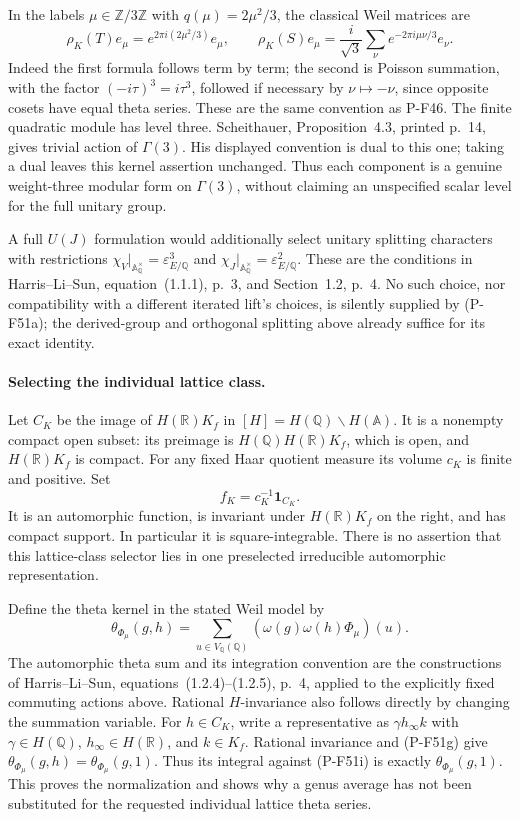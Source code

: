 \documentclass[11pt,a4paper]{article}
\begin{document}
In the labels $\mu\in\mathbb Z/3\mathbb Z$ with
$q(\mu)=2\mu^2/3$, the classical Weil matrices are
\[
 \rho_K(T)e_\mu=e^{2\pi i(2\mu^2/3)}e_\mu,
 \qquad
 \rho_K(S)e_\mu=\frac{i}{\sqrt3}
                  \sum_\nu e^{-2\pi i\mu\nu/3}e_\nu.
 \tag{P-F51h}
\]
Indeed the first formula follows term by term; the
second is Poisson summation, with the factor
$(-i\tau)^3=i\tau^3$, followed if necessary by
$\nu\mapsto-\nu$, since opposite cosets have equal
theta series. These are the same convention as P-F46.
The finite quadratic module has level three.
Scheithauer, Proposition~4.3, printed p.~14, gives
trivial action of $\Gamma(3)$. His displayed convention
is dual to this one; taking a dual leaves this kernel
assertion unchanged. Thus each component is a genuine
weight-three modular form on $\Gamma(3)$, without
claiming an unspecified scalar level for the full
unitary group.

A full $U(J)$ formulation would additionally select
unitary splitting characters with restrictions
$\chi_V|_{\mathbb A_\mathbb Q^\times}=\varepsilon_{E/\mathbb Q}^3$
and $\chi_J|_{\mathbb A_\mathbb Q^\times}=\varepsilon_{E/\mathbb Q}^2$.
These are the conditions in Harris--Li--Sun,
equation~(1.1.1), p.~3, and Section~1.2, p.~4.
No such choice, nor compatibility with a different
iterated lift's choices, is silently supplied by
(P-F51a); the derived-group and orthogonal splitting
above already suffice for its exact identity.

\paragraph{Selecting the individual lattice class.}
Let $C_K$ be the image of
$H(\mathbb R)K_f$ in $[H]=H(\mathbb Q)\backslash H(\mathbb A)$.
It is a nonempty compact open subset: its preimage is
$H(\mathbb Q)H(\mathbb R)K_f$, which is open, and
$H(\mathbb R)K_f$ is compact. For any fixed Haar
quotient measure its volume $c_K$ is finite and positive.
Set
\[
                   f_K=c_K^{-1}\mathbf1_{C_K}.
 \tag{P-F51i}
\]
It is an automorphic function, is invariant under
$H(\mathbb R)K_f$ on the right, and has compact support.
In particular it is square-integrable. There is no
assertion that this lattice-class selector lies in
one preselected irreducible automorphic representation.

Define the theta kernel in the stated Weil model by
\[
 \theta_{\Phi_\mu}(g,h)=
       \sum_{u\in V_{\mathbb Q}(\mathbb Q)}
                         (\omega(g)\omega(h)\Phi_\mu)(u).
 \tag{P-F51j}
\]
The automorphic theta sum and its integration convention
are the constructions of Harris--Li--Sun,
equations~(1.2.4)--(1.2.5), p.~4, applied to the
explicitly fixed commuting actions above.
Rational $H$-invariance also follows
directly by changing the summation variable.
For $h\in C_K$, write a representative as
$\gamma h_\infty k$ with $\gamma\in H(\mathbb Q)$,
$h_\infty\in H(\mathbb R)$, and $k\in K_f$.
Rational invariance and (P-F51g) give
$\theta_{\Phi_\mu}(g,h)=\theta_{\Phi_\mu}(g,1)$.
Thus its integral against (P-F51i) is exactly
$\theta_{\Phi_\mu}(g,1)$. This proves the normalization
and shows why a genus average has not been substituted
for the requested individual lattice theta series.
\end{document}
